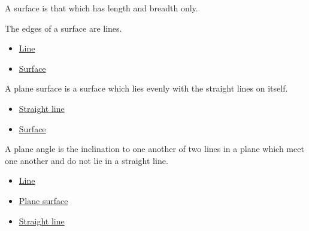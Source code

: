 \begin{definition}[Surface]
\label{def-euclid-surface}
A surface is that which has length and breadth only.
\end{definition}
\begin{lra-not-visible}
\NoLocalDependencies
\end{lra-not-visible}

\begin{definition}
\label{def-euclid-edges-of-a-surface}
The edges of a surface are lines.
\end{definition}
\begin{lra-not-visible}
\begin{dependencies}
\begin{itemize}
  \item \hyperref[def-euclid-line]{Line}
  \item \hyperref[def-euclid-surface]{Surface}
\end{itemize}
\end{dependencies}
\end{lra-not-visible}

\begin{definition}
\label{def-euclid-plane-surface}
A plane surface is a surface which lies evenly with the straight lines on itself.
\end{definition}
\begin{lra-not-visible}
\begin{dependencies}
\begin{itemize}
  \item \hyperref[def-euclid-straight-line]{Straight line}
  \item \hyperref[def-euclid-surface]{Surface}
\end{itemize}
\end{dependencies}
\end{lra-not-visible}

\begin{definition}
\label{def-euclid-plane-angle}
A plane angle is the inclination to one another of two lines in a plane which
meet one another and do not lie in a straight line.
\end{definition}
\begin{lra-not-visible}
\begin{dependencies}
\begin{itemize}
  \item \hyperref[def-euclid-line]{Line}
  \item \hyperref[def-euclid-plane-surface]{Plane surface}
  \item \hyperref[def-euclid-straight-line]{Straight line}
\end{itemize}
\end{dependencies}
\end{lra-not-visible}

